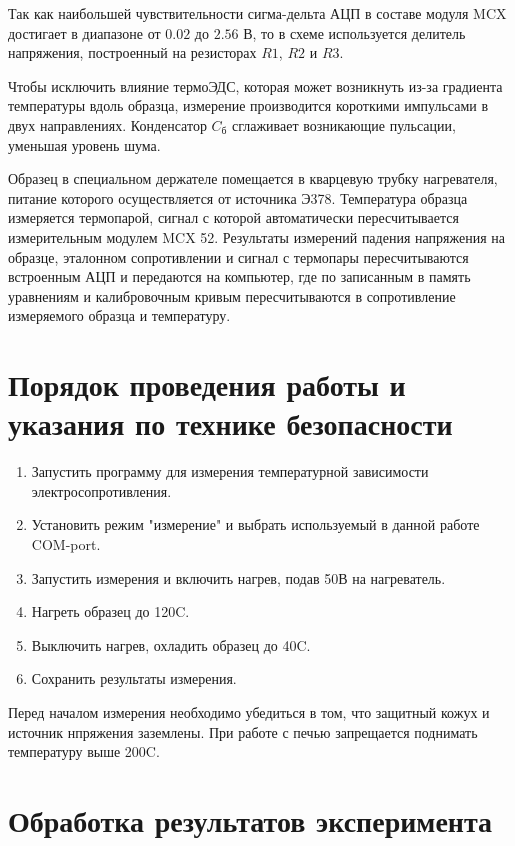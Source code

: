 Так как наибольшей чувствительности сигма-дельта АЦП в составе модуля MCX достигает в диапазоне от $0.02$ до $2.56$ В, то в схеме используется делитель напряжения, построенный на резисторах $R1$, $R2$ и $R3$.

Чтобы исключить влияние термоЭДС, которая может возникнуть из-за градиента температуры вдоль образца, измерение производится короткими импульсами в двух направлениях. Конденсатор $C_{\text{б}}$ сглаживает возникающие пульсации, уменьшая уровень шума.

Образец в специальном держателе помещается в кварцевую трубку нагревателя, питание которого осуществляется от источника Э378. Температура образца измеряется термопарой, сигнал с которой автоматически пересчитывается измерительным модулем MCX 52. Результаты измерений падения напряжения на образце, эталонном сопротивлении и сигнал с термопары пересчитываются встроенным АЦП и передаются на компьютер, где по записанным в память уравнениям и калибровочным кривым пересчитываются в сопротивление измеряемого образца и температуру.

\section{Порядок проведения работы и указания по технике безопасности}

\begin{enumerate}
\item Запустить программу для измерения температурной зависимости электросопротивления.
\item Установить режим "измерение" и выбрать используемый в данной работе COM-port.
\item Запустить измерения и включить нагрев, подав 50В на нагреватель.
\item Нагреть образец до 120\textdegree C.
\item Выключить нагрев, охладить образец до 40\textdegree C.
\item Сохранить результаты измерения.
\end{enumerate}

Перед началом измерения необходимо убедиться в том, что защитный кожух и источник нпряжения заземлены. При работе с печью запрещается поднимать температуру выше 200\textdegree C.

\section{Обработка результатов эксперимента}

